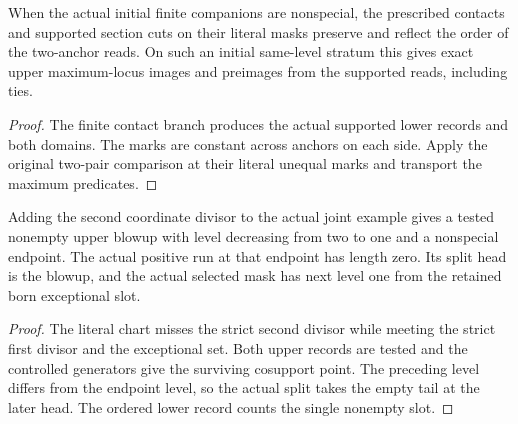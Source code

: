 \begin{theorem}
\label{hir:g1-initial-finite-section-stratum}
\leanok
When the actual initial finite companions are nonspecial, the
prescribed contacts and supported section cuts on their literal
masks preserve and reflect the order of the two-anchor reads.
On such an initial same-level stratum this gives exact upper
maximum-locus images and preimages from the supported reads,
including ties.
\end{theorem}
\begin{proof}
The finite contact branch produces the actual supported lower
records and both domains. The marks are constant across anchors
on each side. Apply the original two-pair comparison at their
literal unequal marks and transport the maximum predicates.
\end{proof}

\begin{theorem}
\label{hir:g1-joint-example-advanced-head}
\leanok
Adding the second coordinate divisor to the actual joint example
gives a tested nonempty upper blowup with level decreasing from
two to one and a nonspecial endpoint. The actual positive run
at that endpoint has length zero. Its split head is the
blowup, and the actual selected mask has next level one from
the retained born exceptional slot.
\end{theorem}
\begin{proof}
The literal chart misses the strict second divisor while meeting
the strict first divisor and the exceptional set. Both upper
records are tested and the controlled generators give the surviving
cosupport point. The preceding level differs from the endpoint
level, so the actual split takes the empty tail at the later
head. The ordered lower record counts the single nonempty slot.
\end{proof}

